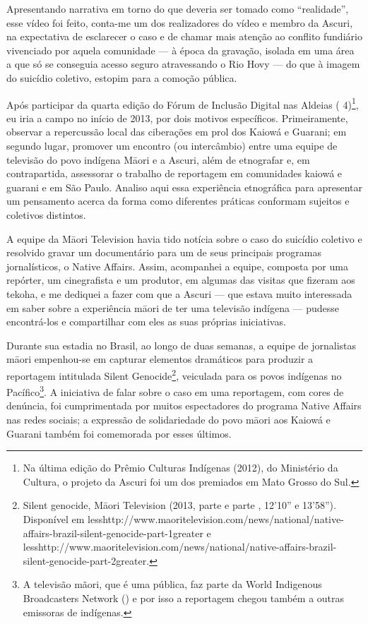 Apresentando narrativa em torno do que deveria ser tomado como
``realidade'', esse vídeo foi feito, conta-me um dos realizadores do
vídeo e membro da Ascuri, na expectativa de esclarecer o caso e de
chamar mais atenção ao conflito fundiário vivenciado por aquela
comunidade — à época da gravação, isolada em uma área a que só se
conseguia acesso seguro atravessando o Rio Hovy — do que à imagem do
suicídio coletivo, estopim para a comoção pública.

Após participar da quarta edição do Fórum de Inclusão Digital nas
Aldeias ( 4)\footnote{Na última edição do Prêmio Culturas Indígenas
(2012), do Ministério da Cultura, o projeto da Ascuri foi um dos
premiados em Mato Grosso do Sul.}, eu iria a campo no início de 2013,
por dois motivos específicos. Primeiramente, observar a repercussão
local das ciberações em prol dos Kaiowá e Guarani; em segundo lugar,
promover um encontro (ou intercâmbio) entre uma equipe de televisão do
povo indígena M\=aori e a Ascuri, além de etnografar e, em
contrapartida, assessorar o trabalho de reportagem em comunidades
kaiowá e guarani e em São Paulo. Analiso aqui essa experiência
etnográfica para apresentar um pensamento acerca da forma como
diferentes práticas conformam sujeitos e coletivos distintos.

A equipe da M\=aori Television havia tido notícia sobre o caso do
suicídio coletivo e resolvido gravar um documentário para um de seus
principais programas jornalísticos, o Native Affairs. Assim, acompanhei
a equipe, composta por uma repórter, um cinegrafista e um produtor, em
algumas das visitas que fizeram aos tekoha, e me dediquei a fazer com
que a Ascuri — que estava muito interessada em saber sobre a
experiência m\=aori de ter uma televisão indígena — pudesse
encontrá-los e compartilhar com eles as suas próprias iniciativas.

Durante sua estadia no Brasil, ao longo de duas semanas, a equipe de
jornalistas m\=aori empenhou-se em capturar elementos dramáticos para
produzir a reportagem intitulada Silent Genocide\footnote{Silent
genocide, M\=aori Television (2013, parte  e parte ,
12'10'' e
13'58''). Disponível %
em
{less}http://www.maoritelevision.com/news/national/native-affairs-brazil-silent-genocide-part-1{greater}
e
{less}http://www.maoritelevision.com/news/national/native-affairs-brazil-silent-genocide-part-2{greater}.},
veiculada para os povos indígenas no Pacífico\footnote{A televisão
mãori, que é uma  pública, faz parte da World Indigenous Broadcasters
Network () e por isso a reportagem chegou também a outras
emissoras de  indígenas. }. A iniciativa de falar sobre o caso em uma
reportagem, com cores de denúncia, foi cumprimentada por muitos
espectadores do programa Native Affairs nas redes sociais; a expressão
de solidariedade do povo m\=aori aos Kaiowá e Guarani também foi
comemorada por esses últimos.

